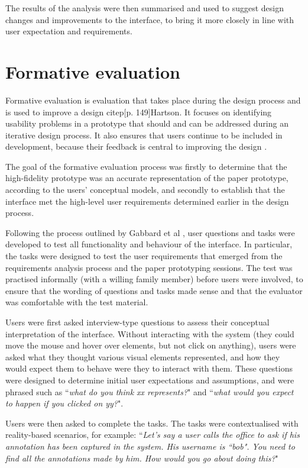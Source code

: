 The results of the analysis were then summarised and used to suggest design changes and improvements to the interface, to bring it more closely in line with user expectation and requirements. 

\section{Formative evaluation}
Formative evaluation is evaluation that takes place during the design process and is used to improve a design citep[p. 149]{Hartson}. It focuses on identifying usability problems in a prototype that should and can be addressed during an iterative design process. It also ensures that users continue to be included in development, because their feedback is central to improving the design \citep{GabbardHix}. 

The goal of the formative evaluation process was firstly to determine that the high-fidelity prototype was an accurate representation of the paper prototype, according to the users' conceptual models, and secondly to establish that the interface met the high-level user requirements determined earlier in the design process.

Following the process outlined by Gabbard et al  \citep{GabbardHix}, user questions and tasks were developed to test all functionality and behaviour of the interface. In particular, the tasks were designed to test the user requirements that emerged from the requirements analysis process and the paper prototyping sessions. The test was practised informally (with a willing family member) before users were involved, to ensure that the wording of questions and tasks made sense and that the evaluator was comfortable with the test material.

Users were first asked interview-type questions to assess their conceptual interpretation of the interface. Without interacting with the system (they could move the mouse and hover over elements, but not click on anything), users were asked what they thought various visual elements represented, and how they would expect them to behave were they to interact with them. These questions were designed to determine initial user expectations and assumptions, and were phrased such as ``\textit{what do you think xx represents?}" and ``\textit{what would you expect to happen if you clicked on yy?}". 

Users were then asked to complete the tasks. The tasks were contextualised with reality-based scenarios, for example: ``\textit{Let's say a user calls the office to ask if his annotation has been captured in the system. His username is ``bob". You need to find all the annotations made by him. How would you go about doing this?}" 

